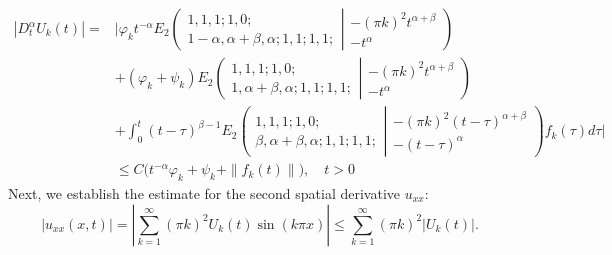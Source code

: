 \documentclass{amsart}
\numberwithin{equation}{section}
\begin{document}
\begin{align}
|D_t^\alpha U_k(t)|=&\bigg|\varphi_k t^{-\alpha} E_2\left( \begin{array}{c}1, 1, 1; 1, 0; \\1-\alpha, \alpha+\beta, \alpha ; 1, 1; 1, 1; \end{array}\left| \begin{array}{c}-(\pi k)^2 t^{\alpha+\beta} \\-t^\alpha \end{array}\right.\right) \nonumber \\
&+(\varphi_k+\psi_k) E_2\left( \begin{array}{c}1, 1, 1; 1, 0; \\1, \alpha+\beta, \alpha ; 1, 1; 1, 1; \end{array}\left| \begin{array}{c}-(\pi k)^2 t^{\alpha+\beta} \\-t^\alpha\end{array}\right.\right) \nonumber \\
&+\int_0^t (t-\tau)^{\beta-1} E_2\left( \begin{array}{c}1, 1, 1; 1, 0; \\\beta, \alpha+\beta, \alpha ; 1, 1; 1, 1;\end{array}\left| \begin{array}{c}-(\pi k)^2 (t-\tau)^{\alpha+\beta} \\-(t-\tau)^\alpha\end{array}\right.\right) f_k(\tau) d\tau \bigg| \nonumber \\
&\leq C\bigg( t^{-\alpha} \varphi_k+ \psi_k+\|f_k(t)\|\bigg), \quad t>0 \label{jumaeva:eq:30}
\end{align}
Next, we establish the estimate for the second spatial derivative $u_{xx}$:
\begin{equation}
|u_{xx}(x,t)| =\left| \sum_{k=1}^\infty (\pi k)^2 U_k(t) \sin(k \pi x) \right| \leq \sum_{k=1}^\infty (\pi k)^2 |U_k(t)|.\label{jumaeva:eq:31}
\end{equation}
\end{document}
